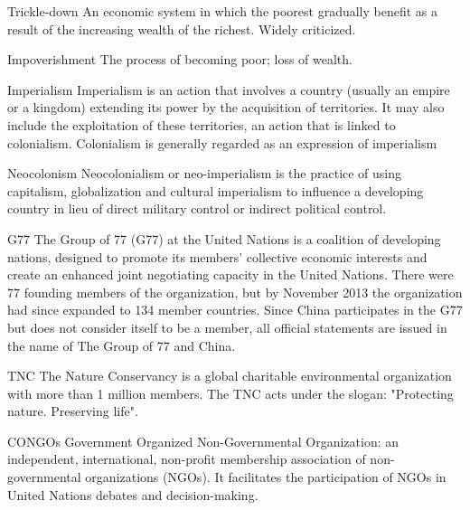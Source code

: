 \begin{sortEnvironment}{Trickle-down}
An economic system in which the poorest gradually benefit as a
result of the increasing wealth of the richest. Widely criticized. 
\end{sortEnvironment}

\begin{sortEnvironment}{Impoverishment}
The process of becoming poor; loss of wealth.
\end{sortEnvironment}

\begin{sortEnvironment}{Imperialism}
Imperialism is an action that involves a country (usually an empire or a kingdom) extending its power by the acquisition of territories. It may also include the exploitation of these territories, an action that is linked to colonialism. Colonialism is generally regarded as an expression of imperialism
\end{sortEnvironment}

\begin{sortEnvironment}{Neocolonism}
Neocolonialism or neo-imperialism is the practice of using capitalism, globalization and cultural imperialism to influence a developing country in lieu of direct military control or indirect political control. 
\end{sortEnvironment}

\begin{sortEnvironment}{G77}
The Group of 77 (G77) at the United Nations is a coalition of developing nations, designed to promote its members' collective economic interests and create an enhanced joint negotiating capacity in the United Nations. There were 77 founding members of the organization, but by November 2013 the organization had since expanded to 134 member countries. Since China participates in the G77 but does not consider itself to be a member, all official statements are issued in the name of The Group of 77 and China.
\end{sortEnvironment}

\begin{sortEnvironment}{TNC}
The Nature Conservancy is a global charitable environmental organization with more than 1 million members. The TNC acts under the slogan: "Protecting nature. Preserving life". 
\end{sortEnvironment}

\begin{sortEnvironment}{CONGOs}
Government Organized Non-Governmental Organization: an independent, international, non-profit membership association of non-governmental organizations (NGOs). It facilitates the participation of NGOs in United Nations debates and decision-making.
\end{sortEnvironment}

